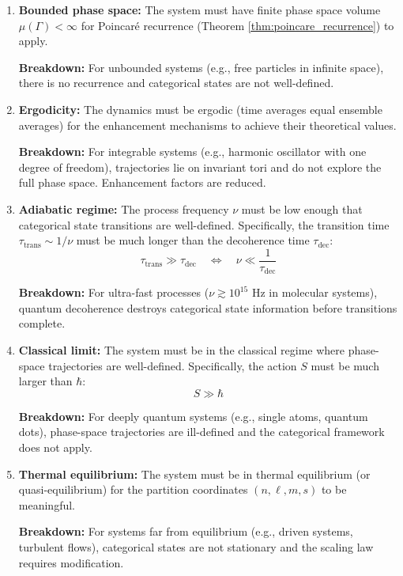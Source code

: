 \documentclass[twocolumn,10pt]{article}
\theoremstyle{remark}
\begin{document}
\begin{enumerate}
    \item \textbf{Bounded phase space:} The system must have finite phase space volume $\mu(\Gamma) < \infty$ for Poincaré recurrence (Theorem \ref{thm:poincare_recurrence}) to apply.

    \textbf{Breakdown:} For unbounded systems (e.g., free particles in infinite space), there is no recurrence and categorical states are not well-defined.

    \item \textbf{Ergodicity:} The dynamics must be ergodic (time averages equal ensemble averages) for the enhancement mechanisms to achieve their theoretical values.

    \textbf{Breakdown:} For integrable systems (e.g., harmonic oscillator with one degree of freedom), trajectories lie on invariant tori and do not explore the full phase space. Enhancement factors are reduced.

    \item \textbf{Adiabatic regime:} The process frequency $\nu$ must be low enough that categorical state transitions are well-defined. Specifically, the transition time $\tau_{\text{trans}} \sim 1/\nu$ must be much longer than the decoherence time $\tau_{\text{dec}}$:
    \begin{equation}
        \tau_{\text{trans}} \gg \tau_{\text{dec}} \quad \Leftrightarrow \quad \nu \ll \frac{1}{\tau_{\text{dec}}}
        \label{eq:adiabatic_condition}
    \end{equation}

    \textbf{Breakdown:} For ultra-fast processes ($\nu \gtrsim 10^{15}$ Hz in molecular systems), quantum decoherence destroys categorical state information before transitions complete.

    \item \textbf{Classical limit:} The system must be in the classical regime where phase-space trajectories are well-defined. Specifically, the action $S$ must be much larger than $\hbar$:
    \begin{equation}
        S \gg \hbar
        \label{eq:classical_condition}
    \end{equation}

    \textbf{Breakdown:} For deeply quantum systems (e.g., single atoms, quantum dots), phase-space trajectories are ill-defined and the categorical framework does not apply.

    \item \textbf{Thermal equilibrium:} The system must be in thermal equilibrium (or quasi-equilibrium) for the partition coordinates $(n, \ell, m, s)$ to be meaningful.

    \textbf{Breakdown:} For systems far from equilibrium (e.g., driven systems, turbulent flows), categorical states are not stationary and the scaling law requires modification.
\end{enumerate}
\end{document}

